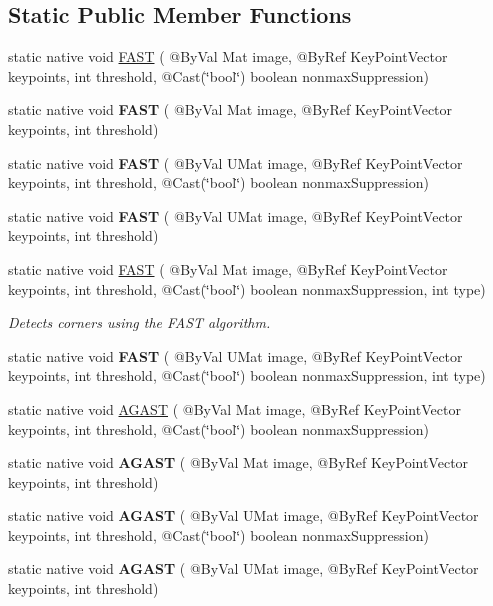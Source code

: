 \subsection*{Static Public Member Functions}
\begin{DoxyCompactItemize}
\item 
static native void \hyperlink{group__features2d__main_gabceff7e5d16ac9f888fa12e3e8a3f39e}{F\+A\+ST} ( @By\+Val Mat image, @By\+Ref Key\+Point\+Vector keypoints, int threshold, @Cast(\char`\"{}bool\char`\"{}) boolean nonmax\+Suppression)
\item 
static native void {\bfseries F\+A\+ST} ( @By\+Val Mat image, @By\+Ref Key\+Point\+Vector keypoints, int threshold)
\item 
static native void {\bfseries F\+A\+ST} ( @By\+Val U\+Mat image, @By\+Ref Key\+Point\+Vector keypoints, int threshold, @Cast(\char`\"{}bool\char`\"{}) boolean nonmax\+Suppression)
\item 
static native void {\bfseries F\+A\+ST} ( @By\+Val U\+Mat image, @By\+Ref Key\+Point\+Vector keypoints, int threshold)
\item 
static native void \hyperlink{group__features2d__main_ga7b940fc6d27c261d531040a7f8dd22af}{F\+A\+ST} ( @By\+Val Mat image, @By\+Ref Key\+Point\+Vector keypoints, int threshold, @Cast(\char`\"{}bool\char`\"{}) boolean nonmax\+Suppression, int type)
\begin{DoxyCompactList}\small\item\em Detects corners using the F\+A\+ST algorithm. \end{DoxyCompactList}\item 
static native void {\bfseries F\+A\+ST} ( @By\+Val U\+Mat image, @By\+Ref Key\+Point\+Vector keypoints, int threshold, @Cast(\char`\"{}bool\char`\"{}) boolean nonmax\+Suppression, int type)
\item 
static native void \hyperlink{group__features2d__main_ga849ee8acfb310ef13c3fd8a8f25327ed}{A\+G\+A\+ST} ( @By\+Val Mat image, @By\+Ref Key\+Point\+Vector keypoints, int threshold, @Cast(\char`\"{}bool\char`\"{}) boolean nonmax\+Suppression)
\item 
static native void {\bfseries A\+G\+A\+ST} ( @By\+Val Mat image, @By\+Ref Key\+Point\+Vector keypoints, int threshold)
\item 
static native void {\bfseries A\+G\+A\+ST} ( @By\+Val U\+Mat image, @By\+Ref Key\+Point\+Vector keypoints, int threshold, @Cast(\char`\"{}bool\char`\"{}) boolean nonmax\+Suppression)
\item 
static native void {\bfseries A\+G\+A\+ST} ( @By\+Val U\+Mat image, @By\+Ref Key\+Point\+Vector keypoints, int threshold)

\end{DoxyCompactItemize}
